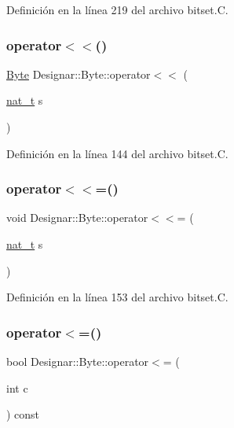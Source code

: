 Definición en la línea 219 del archivo bitset.\+C.

\mbox{\label{class_designar_1_1_byte_abd14d60584eec419a494785dc66e1156}} 
\subsubsection{\texorpdfstring{operator$<$$<$()}{operator<<()}}
{\footnotesize\ttfamily \hyperlink{class_designar_1_1_byte}{Byte} Designar\+::\+Byte\+::operator$<$$<$ (\begin{DoxyParamCaption}\item[{\hyperlink{namespace_designar_aa72662848b9f4815e7bf31a7cf3e33d1}{nat\+\_\+t}}]{s }\end{DoxyParamCaption})}



Definición en la línea 144 del archivo bitset.\+C.

\mbox{\label{class_designar_1_1_byte_a6d13481b7b6bc22a62c1b8998d851c29}} 
\subsubsection{\texorpdfstring{operator$<$$<$=()}{operator<<=()}}
{\footnotesize\ttfamily void Designar\+::\+Byte\+::operator$<$$<$= (\begin{DoxyParamCaption}\item[{\hyperlink{namespace_designar_aa72662848b9f4815e7bf31a7cf3e33d1}{nat\+\_\+t}}]{s }\end{DoxyParamCaption})}



Definición en la línea 153 del archivo bitset.\+C.

\mbox{\label{class_designar_1_1_byte_aec225f858e548268a54d23bb828cc12f}} 
\subsubsection{\texorpdfstring{operator$<$=()}{operator<=()}}
{\footnotesize\ttfamily bool Designar\+::\+Byte\+::operator$<$= (\begin{DoxyParamCaption}\item[{int}]{c }\end{DoxyParamCaption}) const}



